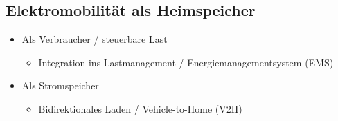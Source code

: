 \subsection{Elektromobilität als Heimspeicher}
\begin{itemize}
    \item Als Verbraucher / steuerbare Last
    \begin{itemize}
      \item Integration ins Lastmanagement / Energiemanagementsystem (EMS)
    \end{itemize}
    \item Als Stromspeicher
    \begin{itemize}
      \item Bidirektionales Laden / Vehicle-to-Home (V2H)
    \end{itemize}
  \end{itemize}
























